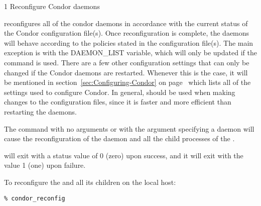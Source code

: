 \begin{ManPage}{\label{man-condor-reconfig}}{1}
{Reconfigure Condor daemons}
\Synopsis {}
\ToolArgsBase

\ToolArgsLocate
\ToolArgsAffect
{}

\ToolWhere
\ToolArgsAffect
{}


\Description 

 reconfigures all of the condor daemons in accordance with 
the current
status of the Condor configuration file(s).  
Once reconfiguration is complete, the daemons will behave according to
the policies stated in the configuration file(s).
The main exception is with the DAEMON\_LIST variable, which will only be
updated if the  command is used.  
There are a few other configuration settings that can only be changed
if the Condor daemons are restarted.
Whenever this is the case, it will be mentioned in
section~\ref{sec:Configuring-Condor} on
page~\pageref{sec:Configuring-Condor} which lists all of the settings
used to configure Condor. 
In general,  should be used when making changes to
the configuration files, since it is faster and more efficient than
restarting the daemons.

The command 
with no arguments or with the  argument specifying
a daemon will cause the reconfiguration of the 
daemon and all the child processes of the .

\begin{Options}
    \ToolArgsBaseDesc
    \ToolArgsLocateDesc
\end{Options}

\ExitStatus

 will exit with a status value of 0 (zero) upon success,
and it will exit with the value 1 (one) upon failure.

\Examples
To reconfigure the  and all its children
on the local host:
\begin{verbatim}
% condor_reconfig
\end{verbatim}


\end{ManPage}
